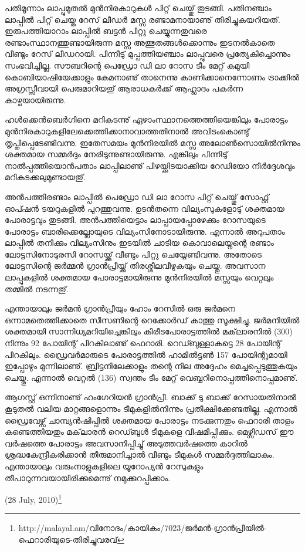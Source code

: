 പതിമൂന്നാം ലാപ്പുമുതല്‍ മുന്‍നിരകാറുകള്‍ പിറ്റ് ചെയ്തു് തുടങ്ങി. പതിനഞ്ചാം ലാപ്പില്‍ പിറ്റ് ചെയ്ത റേസ് ലീഡര്‍ മസ്സ 
രണ്ടാമനായാണു് തിരിച്ചുകയറിയത്. ഇരുപത്തിയാറാം ലാപ്പില്‍ ബട്ടന്‍ പിറ്റു ചെയ്യുന്നതുവരെ രണ്ടാംസ്ഥാനത്തുണ്ടായിരുന്ന 
മസ്സ അത്ഭുതങ്ങള്‍ക്കൊന്നും ഇടനല്‍കാതെ വീണ്ടും റേസ് ലീഡറായി. പിന്നീടു് മുപ്പത്തിയഞ്ചാം 
ലാപ്പുവരെ പ്രത്യേകിച്ചൊന്നും സംഭവിച്ചില്ല. സൗബറിന്റെ പെഡ്രോ ഡി ലാ റോസ ടീം മേറ്റ് കമുയി 
കൊബിയാഷിയേക്കാളും കേമനാണു് താനെന്നു കാണിക്കാനെന്നോണം ട്രാക്കില്‍ അഗ്രസ്സീവായി പെരുമാറിയതു് 
ആരാധകര്‍ക്ക് ആഹ്ലാദം പകര്‍ന്ന കാഴ്ചയായിരുന്നു.

ഹള്‍ക്കെന്‍ബെര്‍ഗിനെ മറികടന്നു് ഏഴാംസ്ഥാനത്തെത്തിയെങ്കിലും പോരാട്ടം 
മുന്‍നിരകാറുകളിലേക്കെത്തിക്കാനാവാത്തതിനാല്‍ അവിടംകൊണ്ടു് തൃപ്തിപ്പെടേണ്ടിവന്നു. ഇതേസമയം മുന്‍നിരയില്‍ 
മസ്സ അലോണ്‍സൊയില്‍നിന്നും ശക്തമായ സമ്മര്‍ദ്ദം നേരിടുന്നുണ്ടായിരുന്നു. എങ്കിലും പിന്നിടു് നാല്‍പ്പത്തിയൊന്‍പതാം 
ലാപ്പിലാണു് പിഴയ്ക്കിടയാക്കിയ റേഡിയോ നിര്‍ദ്ദേശവും മറികടക്കലുമുണ്ടായതു്.

അന്‍പത്തിരണ്ടാം ലാപ്പില്‍ പെഡ്രോ ഡി ലാ റോസ പിറ്റ് ചെയ്തു് സോഫ്റ്റ് ഓപ്ഷന്‍ ടയറുകളില്‍ പുറത്തുവന്നു. ഉടന്‍തന്നെ 
വില്യംസുകളോടു് ശക്തമായ പോരാട്ടവും തുടങ്ങി. അന്‍പത്തിയെട്ടാം ലാപ്പായപ്പോഴേക്കും റോസയുടെ പോരാട്ടം 
ബാരിക്കെല്ലോയുടെ വില്യംസിനോടായിരുന്നു. എന്നാല്‍ അറുപതാം ലാപ്പില്‍ തനിക്കും വില്യംസിനും ഇടയില്‍ ചാടിയ 
കൊവാലെയ്നന്റെ രണ്ടാം ലോട്ടസിനോടുരസി റോസയ്ക്കു് വീണ്ടും പിറ്റു ചെയ്യേണ്ടിവന്നു. അതോടെ ലോട്ടസിന്റെ ജര്‍മ്മന്‍ 
ഗ്രാന്‍പ്രീയ്ക്ക് തിരശ്ശീലവീഴുകയും ചെയ്തു. അവസാന ലാപ്പുകളില്‍ ശക്തമായ പോരാട്ടമായിരുന്നു മുന്‍നിരയില്‍ മസ്സയും 
വെറ്റലും തമ്മില്‍ നടന്നതു്.

എന്തായാലും ജര്‍മന്‍ ഗ്രാന്‍പ്രീയും ഹോം റേസില്‍ ഒരു ജര്‍മനെ ഒന്നാമതെത്തിക്കാതെ സീസണിന്റെ റെക്കോര്‍ഡ് കാത്തു 
സൂക്ഷിച്ചു. ജര്‍മനിയില്‍ ശക്തമായി സാന്നിധ്യമറിയിച്ചെങ്കിലും കിരീടപോരാട്ടത്തില്‍ മക്‌ലാരനില്‍ (300) നിന്നും 92 
പോയിന്റ് പിറകിലാണു് ഫെറാരി. റെഡ്ബുള്ളാകട്ടെ 28 പോയിന്റ് പിറകിലും. ഡ്രൈവര്‍മാരുടെ പോരാട്ടത്തില്‍ 
ഹാമില്‍ട്ടണ്‍ 157 പോയിന്റുമായി ഇപ്പോഴും മുന്നിലാണു്. ബ്രിട്ടനിലേക്കാളും തന്റെ നില അദ്ദേഹം മെച്ചപ്പെടുത്തുകയും 
ചെയ്തു. എന്നാല്‍ വെറ്റല്‍ (136) സ്വന്തം ടീം മേറ്റ് വെബ്ബറിനൊപ്പത്തിനൊപ്പമാണു്.

ആഗസ്റ്റ് ഒന്നിനാണു് ഹംഗേറിയന്‍ ഗ്രാന്‍പ്രീ. ബാക്ക് ടു ബാക്ക് റേസായതിനാല്‍ കൂടുതല്‍ വലിയ മാറ്റങ്ങളൊന്നും 
ടീമുകളില്‍നിന്നും പ്രതീക്ഷിക്കേണ്ടതില്ല. എന്നാല്‍ ഡ്രൈവേഴ്സ് ചാമ്പ്യന്‍ഷിപ്പില്‍ ശക്തമായ പോരാട്ടം നടക്കുന്നതും ഫെറാരി 
താളം കണ്ടെത്തിയതും മക്‌ലാരന്‍ റെഡ്ബുള്‍ ടീമുകളെ വിഷമിപ്പിക്കും. മെഴ്സിഡസ് ഈ വര്‍ഷത്തെ പോരാട്ടം 
അവസാനിപ്പിച്ചു് അടുത്തവര്‍ഷത്തെ കാറില്‍ ശ്രദ്ധകേന്ദ്രീകരിക്കാന്‍ തീരുമാനിച്ചാല്‍ വീണ്ടും ടീമുകള്‍ സമ്മര്‍ദ്ദത്തിലാകും.
എന്തായാലും വരുംനാളുകളിലെ യൂറോപ്യന്‍ റേസുകളും തീപാറുന്നവയായിരിക്കുമെന്നു് നമുക്കുറപ്പിക്കാം.

\begin{flushright}(28 July, 2010)\footnote{http://malayal.am/വിനോദം/കായികം/7023/ജര്‍മന്‍-ഗ്രാന്‍പ്രീയില്‍-ഫെറാരിയുടെ-തിരിച്ചുവരവ്}\end{flushright}

\newpage
